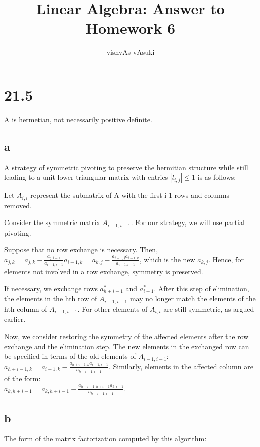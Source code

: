 \documentclass[10pt]{amsart}
\title{Linear Algebra: Answer to Homework 6}
\author{vishvAs vAsuki}
\theoremstyle{remark}
\begin{document}
\maketitle

\section{21.5}
A is hermetian, not necessarily positive definite.

\subsection{a}
A strategy of symmetric pivoting to preserve the hermitian structure while still leading to a unit lower triangular matrix with entries $|l_{i,j}| \leq 1$ is as follows:

Let $A_{i,i}$ represent the submatrix of A with the first i-1 rows and columns removed.

Consider the symmetric matrix $A_{i-1, i-1}$. For our strategy, we will use partial pivoting.

Suppose that no row exchange is necessary. Then, $a_{j,k} = a_{j,k} - \frac{a_{j,i-1}}{a_{i-1,i-1}}a_{i-1,k} = a_{k,j} - \frac{a_{i-1, j} a_{i-1,k}}{a_{i-1,i-1}} $, which is the new $a_{k,j}$. Hence, for elements not involved in a row exchange, symmetry is preserved.

If necessary, we exchange rows $a_{h+i-1}^{*}$ and $a_{i-1}^{*}$. After this step of elimination, the elements in the hth row of $A_{i-1,i-1}$ may no longer match the elements of the hth column of $A_{i-1,i-1}$. For other elements of $A_{i,i}$ are still symmetric, as argued earlier.

Now, we consider restoring the symmetry of the affected elements after the row exchange and the elimination step. The new elements in the exchanged row can be specified in terms of the old elements of $A_{i-1,i-1}$: $a_{h+i-1,k} = a_{i-1,k} - \frac{a_{h+i-1,k}a_{i-1,i-1}}{a_{h+i-1,i-1}}$. Similarly, elements in the affected column are of the form: \\
$a_{k,h+i-1} = a_{k, h+i-1} - \frac{a_{h+i-1, h+i-1}a_{k,i-1}}{a_{h+i-1,i-1}}$.
\tbc

\subsection{b}
The form of the matrix factorization computed by this algorithm:

\tbc
\end{document}
